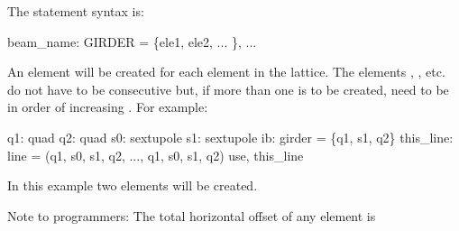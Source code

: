 The  statement syntax is:
\begin{example}
  beam_name: GIRDER = \{ele1, ele2, ... \}, ...
\end{example}
An  element will be created for each  element in
the lattice. The elements , , etc. do not have to be
consecutive but, if more than one  is to be created, need
to be in order of increasing .
For example:
\begin{example}
  q1: quad
  q2: quad
  s0: sextupole
  s1: sextupole
  ib: girder = \{q1, s1, q2\}
  this_line: line = (q1, s0, s1, q2, ..., q1, s0, s1, q2)
  use, this_line
\end{example}
In this example two  elements will be created.

Note to programmers: The total horizontal offset of any element is
